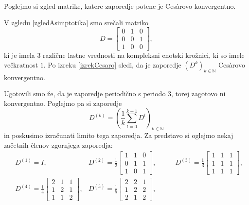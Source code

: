 \documentclass[mat1]{fmfdelo}
\newcommand{\N}{\mathbb N}
\begin{document}
Poglejmo si zgled matrike, katere zaporedje potenc je Ces\`arovo konvergentno.
\begin{zgled}
    V zgledu \ref{zgledAsimptotika} smo srečali matriko
    \begin{equation*}
        D =
        \begin{bmatrix}
            0 & 1 & 0 \\
            0 & 0 & 1 \\
            1 & 0 & 0
        \end{bmatrix},
    \end{equation*}
    ki je imela $3$ različne lastne vrednosti na kompleksni enotski krožnici, ki so imele večkratnost $1$. Po izreku \ref{izrekCesaro} sledi, da je zaporedje $(D^k)_{k\in\N}$ Ces\`arovo konvergentno.
    
    Ugotovili smo že, da je zaporedje periodično s periodo 3, torej zagotovo ni konvergentno. Poglejmo pa si zaporedje
    \begin{equation*}
        D^{(k)} = \left(\frac{1}{k} \sum_{l=0}^{k-1} D^l\right)_{k\in\N}
    \end{equation*}
    in poskusimo izračunati limito tega zaporedja. Za predstavo si oglejmo nekaj začetnih členov zgornjega zaporedja:
    \begin{align*}
        &D^{(1)} = I,
        &D^{(2)} = \frac{1}{2}
        \begin{bmatrix}
            1 & 1 & 0 \\
            0 & 1 & 1 \\
            1 & 0 & 1
        \end{bmatrix},\quad\quad
        &D^{(3)} = \frac{1}{3}
        \begin{bmatrix}
            1 & 1 & 1 \\
            1 & 1 & 1 \\
            1 & 1 & 1
        \end{bmatrix},\\
        &D^{(4)} = \frac{1}{4}
        \begin{bmatrix}
            2 & 1 & 1 \\
            1 & 2 & 1 \\
            1 & 1 & 2
        \end{bmatrix},
        &D^{(5)} = \frac{1}{5}
        \begin{bmatrix}
            2 & 2 & 1 \\
            1 & 2 & 2 \\
            2 & 1 & 2
        \end{bmatrix},\quad\quad

\end{align*}
\end{zgled}
\end{document}
